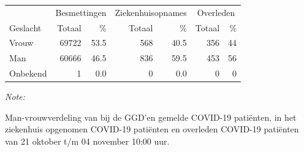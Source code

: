 \documentclass[
  english,
  man,floatsintext]{apa6}
\begin{document}
\begin{table}[H]
\centering\begingroup\fontsize{11}{13}\selectfont

\begin{threeparttable}
\begin{tabular}{lrrrrrr}
\toprule
\multicolumn{1}{c}{ } & \multicolumn{2}{c}{Besmettingen} & \multicolumn{2}{c}{Ziekenhuisopnames} & \multicolumn{2}{c}{Overleden} \\
\cmidrule(l{3pt}r{3pt}){2-3} \cmidrule(l{3pt}r{3pt}){4-5} \cmidrule(l{3pt}r{3pt}){6-7}
Geslacht & Totaal & \% & Totaal & \% & Totaal & \%\\
\midrule
Vrouw & 69722 & 53.5 & 568 & 40.5 & 356 & 44\\
Man & 60666 & 46.5 & 836 & 59.5 & 453 & 56\\
Onbekend & 1 & 0.0 & 0 & 0.0 & 0 & 0\\
\bottomrule
\end{tabular}
\begin{tablenotes}
\item \textit{Note: } 
\item Man-vrouwverdeling van bij de GGD’en gemelde COVID-19 patiënten, in het ziekenhuis opgenomen COVID-19 patiënten en overleden COVID-19 patiënten van 21 oktober t/m 04 november 10:00 uur.
\end{tablenotes}
\end{threeparttable}
\endgroup{}
\end{table}
\newpage
\end{document}
